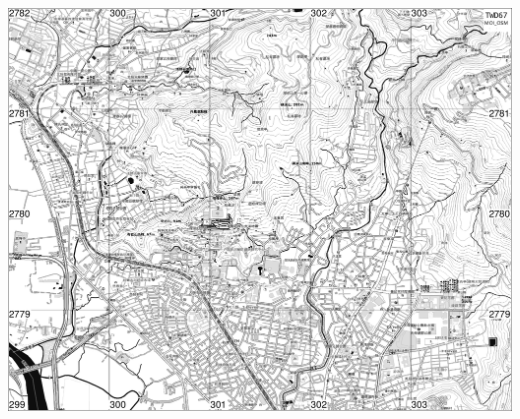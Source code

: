 \documentclass{article}
\begin{document}
\begin{CJK*}{UTF8}{bkai}
\begin{multicols}{2}

\includegraphics[width=20.73cm, height=16.58cm]{osm-map.png}


\end{multicols}
\end{CJK*}
\end{document}
